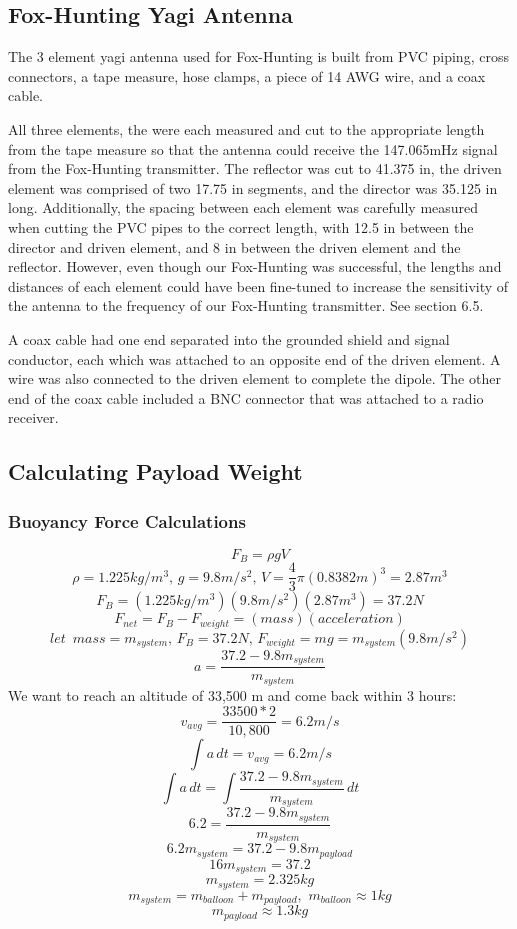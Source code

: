 \documentclass[12pt,]{article}
\begin{document}
\subsection{Fox-Hunting Yagi Antenna}\label{fox-hunting-yagi-antenna}

The 3 element yagi antenna used for Fox-Hunting is built from PVC
piping, cross connectors, a tape measure, hose clamps, a piece of 14 AWG
wire, and a coax cable.

All three elements, the were each measured and cut to the appropriate
length from the tape measure so that the antenna could receive the
147.065mHz signal from the Fox-Hunting transmitter. The reflector was
cut to 41.375 in, the driven element was comprised of two 17.75 in
segments, and the director was 35.125 in long. Additionally, the spacing
between each element was carefully measured when cutting the PVC pipes
to the correct length, with 12.5 in between the director and driven
element, and 8 in between the driven element and the reflector. However,
even though our Fox-Hunting was successful, the lengths and distances of
each element could have been fine-tuned to increase the sensitivity of
the antenna to the frequency of our Fox-Hunting transmitter. See section
6.5.

A coax cable had one end separated into the grounded shield and signal
conductor, each which was attached to an opposite end of the driven
element. A wire was also connected to the driven element to complete the
dipole. The other end of the coax cable included a BNC connector that
was attached to a radio receiver.

\subsection{Calculating Payload
Weight}\label{calculating-payload-weight}

\subsubsection{Buoyancy Force
Calculations}\label{buoyancy-force-calculations}

\[F_B=\rho g V\]
\[\rho = 1.225kg/m^3, \, g = 9.8m/s^2, \, V = \frac{4}{3}\pi(0.8382m)^3=2.87m^3\]
\[F_B = (1.225kg/m^3)(9.8m/s^2)(2.87m^3)= 37.2N\]
\[F_{net} = F_B - F_{weight} = (mass)(acceleration)\]
\[let\, \,\,mass = m_{system}, \, F_B = 37.2N, \, F_{weight} = mg = m_{system}(9.8m/s^2)\]
\[a = \frac{37.2 - 9.8m_{system}}{m_{system}}\] We want to reach an
altitude of 33,500 m and come back within 3 hours:
\[v_{avg} = \frac{33500 * 2}{10,800} = 6.2m/s\]
\[\int a\,dt = v_{avg} = 6.2m/s\]
\[\int a\,dt = \int \frac{37.2-9.8m_{system}}{m_{system}} \, dt\]
\[6.2 = \frac{37.2-9.8m_{system}}{m_{system}}\]
\[6.2m_{system} = 37.2 - 9.8m_{payload}\] \[16m_{system} = 37.2\]
\[\boxed{m_{system} = 2.325kg}\]
\[m_{system} = m_{balloon} + m_{payload}, \, \, m_{balloon} \approx 1kg\]
\[m_{payload} \approx 1.3kg\]
\end{document}
